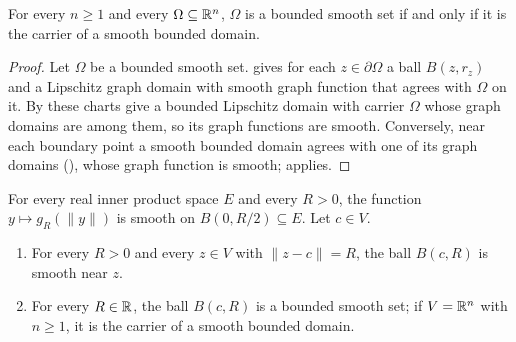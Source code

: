 \begin{theorem}
\label{thm:bounded-smooth-sets}
\leanok
{}
For every $n \geq 1$ and every $\Omega \subseteq \mathbb{R}^n$, $\Omega$ is a bounded smooth set if and
only if it is the carrier of a smooth bounded domain.
\end{theorem}

\begin{proof}
\leanok
Let $\Omega$ be a bounded smooth set.  gives for each
$z \in \partial\Omega$ a ball $B(z, r_z)$ and a Lipschitz graph domain with smooth graph function
that agrees with $\Omega$ on it. By  these charts give a bounded
Lipschitz domain with carrier $\Omega$ whose graph domains are among them, so its graph functions
are smooth. Conversely, near each boundary point a smooth bounded domain agrees with one of its
graph domains (), whose graph function is smooth;
 applies.
\end{proof}

\begin{theorem}
\label{thm:smooth-ball}
\leanok
{}
For every real inner product space $E$ and every $R > 0$, the function $y \mapsto g_R(\|y\|)$ is
smooth on $B(0, R/2) \subseteq E$. Let $c \in V$.
\begin{enumerate}
  \item For every $R > 0$ and every $z \in V$ with $\|z - c\| = R$, the ball $B(c, R)$ is smooth
    near $z$.
  \item For every $R \in \mathbb{R}$, the ball $B(c, R)$ is a bounded smooth set; if $V = \mathbb{R}^n$ with
    $n \geq 1$, it is the carrier of a smooth bounded domain.
\end{enumerate}
\end{theorem}

